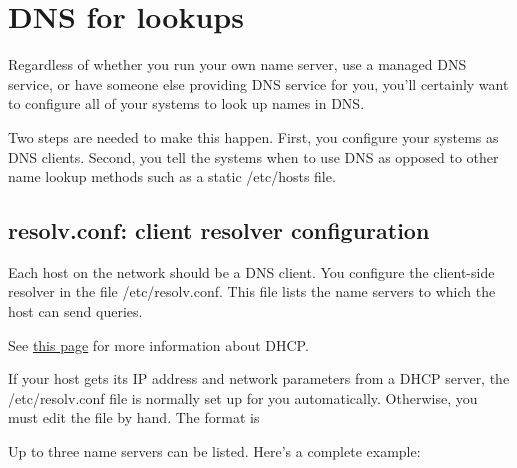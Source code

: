 \section{DNS for lookups}

\protect\hypertarget{part0024_split_004.htmlux5cux23_idIndexMarker1975}{}{}Regardless
of whether you run your own name server, use a managed DNS service, or
have someone else providing DNS service for you, you'll certainly want
to configure all of your systems to look up names in DNS.

Two steps are needed to make this happen. First, you configure your
systems as DNS clients. Second, you tell the systems when to use DNS as
opposed to other name lookup methods such as a static {/etc/hosts} file.

\protect\hypertarget{part0024_split_005.html}{}{}

\hypertarget{part0024_split_005.htmlux5cux23_idContainer1069}{}
\hypertarget{part0024_split_005.htmlux5cux23calibre_pb_4}{%
\subsection[: client resolver
configuration]{\texorpdfstring{{\protect\hypertarget{part0024_split_005.htmlux5cux23_idTextAnchor847}{}{}resolv.conf}:
client resolver
configuration}{resolv.conf: client resolver configuration}}\label{part0024_split_005.htmlux5cux23calibre_pb_4}}

\protect\hypertarget{part0024_split_005.htmlux5cux23_idIndexMarker1976}{}{}Each
host on the network should be a DNS client. You configure the
client-side resolver in the file
\protect\hypertarget{part0024_split_005.htmlux5cux23_idIndexMarker1977}{}{}\protect\hypertarget{part0024_split_005.htmlux5cux23_idIndexMarker1978}{}{}{/etc/resolv.conf}.
This file lists the name servers to which the host can send queries.

\leavevmode\hypertarget{part0024_split_005.htmlux5cux23_idContainer907}{}%
See
\protect\hyperlink{part0021_split_027.htmlux5cux23_idTextAnchor674}{this
page} for more information about DHCP.

If your host gets its IP address and network parameters from a DHCP
server, the {/etc/resolv.conf} file is normally set up for you
automatically. Otherwise, you must edit the file by hand. The format is


Up to three name servers can be listed. Here's a complete
example:\protect\hypertarget{part0024_split_005.htmlux5cux23_idIndexMarker1979}{}{}\protect\hypertarget{part0024_split_005.htmlux5cux23_idIndexMarker1980}{}{}

